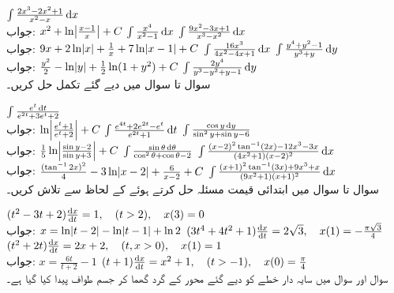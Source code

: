 $\int\frac{2x^3-2x^2+1}{x^2-x}\dif x$\\
جواب:\quad
$x^2+\ln\abs{\tfrac{x-1}{x}}+C$
$\int \frac{x^4}{x^2-1}\dif x$
$\int\frac{9x^2-3x+1}{x^3-x^2}\dif x$\\
جواب:\quad
$9x+2\ln\abs{x}+\tfrac{1}{x}+7\ln\abs{x-1}+C$
$\int\frac{16x^3}{4x^2-4x+1}\dif x$
$\int\frac{y^4+y^2-1}{y^3+y}\dif y$\\
جواب:\quad
$\tfrac{y^2}{2}-\ln\abs{y}+\tfrac{1}{2}\ln(1+y^2)+C$
$\int\frac{2y^4}{y^3-y^2+y-1}\dif y$
\\
سوال  تا سوال  میں دیے گئے تکمل حل کریں۔

$\int\frac{e^t\dif t}{e^{2t}+3e^t+2}$\\
جواب:\quad
$\ln\abs{\tfrac{e^t+1}{e^t+2}}+C$
$\int\frac{e^{4t}+2e^{2t}-e^t}{e^{2t}+1}\dif t$
$\int\frac{\cos y\dif y}{\sin^2y+\sin y-6}$\\
جواب:\quad
$\tfrac{1}{5}\ln\abs{\tfrac{\sin y-2}{\sin y+3}}+C$
$\int\frac{\sin\theta\dif\theta}{\cos^2\theta+\cos\theta-2}$
$\int\frac{(x-2)^2\tan^{-1}(2x)-12x^3-3x}{(4x^2+1)(x-2)^2}\dif x$\\
جواب:\quad
$\tfrac{(\tan^{-1}2x)^2}{4}-3\ln\abs{x-2}+\tfrac{6}{x-2}+C$
$\int\frac{(x+1)^2\tan^{-1}(3x)+9x^3+x}{(9x^2+1)(x+1)^2}\dif x$
\\
سوال  تا سوال  میں ابتدائی قیمت مسئلہ حل کرتے ہوئے  کے لحاظ سے  تلاش کریں۔

$(t^2-3t+2)\frac{\dif x}{\dif t}=1,\quad (t>2),\quad x(3)=0$\\
جواب:\quad
$x=\ln\abs{t-2}-\ln\abs{t-1}+\ln 2$
$(3t^4+4t^2+1)\frac{\dif x}{\dif t}=2\sqrt{3},\quad x(1)=-\tfrac{\pi\sqrt{3}}{4}$
$(t^2+2t)\frac{\dif x}{\dif t}=2x+2,\quad (t,x>0),\quad x(1)=1$\\
جواب:\quad
$x=\tfrac{6t}{t+2}-1$
$(t+1)\frac{\dif x}{\dif t}=x^2+1,\quad (t>-1),\quad x(0)=\tfrac{\pi}{4}$
\\
سوال  اور سوال  میں سایہ دار خطے کو دیے گئے محور کے گرد گھما کر جسم طواف پیدا کیا گیا ہے۔ 

